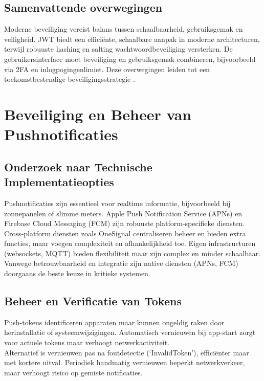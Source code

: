 \subsection{Samenvattende overwegingen}
Moderne beveiliging vereist balans tussen schaalbaarheid, gebruiksgemak en veiligheid. JWT biedt een efficiënte, schaalbare aanpak in moderne architecturen, terwijl robuuste hashing en salting wachtwoordbeveiliging versterken. De gebruikersinterface moet beveiliging en gebruiksgemak combineren, bijvoorbeeld via 2FA en inlogpogingenlimiet. Deze overwegingen leiden tot een toekomstbestendige beveiligingsstrategie \autocite{Gao2023, Gupta2022, Arias2025, ReesCarter2024, Chinnasamy2025, Jurisons2024}.

\section{Beveiliging en Beheer van Pushnotificaties}

\subsection{Onderzoek naar Technische Implementatieopties}
Pushnotificaties zijn essentieel voor realtime informatie, bijvoorbeeld bij zonnepanelen of slimme meters. Apple Push Notification Service (APNs) en Firebase Cloud Messaging (FCM) zijn robuuste platform-specifieke diensten.\\

Cross-platform diensten zoals OneSignal centraliseren beheer en bieden extra functies, maar voegen complexiteit en afhankelijkheid toe. Eigen infrastructuren (websockets, MQTT) bieden flexibiliteit maar zijn complex en minder schaalbaar.\\

Vanwege betrouwbaarheid en integratie zijn native diensten (APNs, FCM) doorgaans de beste keuze in kritieke systemen.

\subsection{Beheer en Verificatie van Tokens}
Push-tokens identificeren apparaten maar kunnen ongeldig raken door herinstallatie of systeemwijzigingen. Automatisch vernieuwen bij app-start zorgt voor actuele tokens maar verhoogt netwerkactiviteit.\\

Alternatief is vernieuwen pas na foutdetectie (‘InvalidToken’), efficiënter maar met kortere uitval. Periodiek handmatig vernieuwen beperkt netwerkverkeer, maar verhoogt risico op gemiste notificaties.\\

